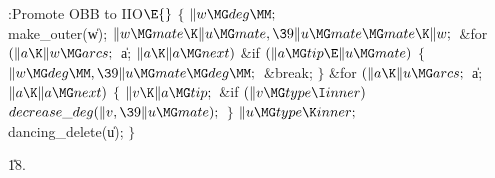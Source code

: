 \B{}:Promote OBB to IIO\X${}\E{}$\6
${}\{{}$\1\6
${}\|w\MG\\{deg}\MM;{}$\6
\\{make\_outer}(\|w);\6
${}\|w\MG\\{mate}\K\|u\MG\\{mate},\39\|u\MG\\{mate}\MG\\{mate}\K\|w;{}$\6
\&{for} ${}(\|a\K\|w\MG\\{arcs};{}$ \|a; ${}\|a\K\|a\MG\\{next}){}$\1\6
\&{if} ${}(\|a\MG\\{tip}\E\|u\MG\\{mate}){}$\5
${}\{{}$\1\6
${}\|w\MG\\{deg}\MM,\39\|u\MG\\{mate}\MG\\{deg}\MM;{}$\6
\&{break};\6
\4${}\}{}$\2\2\6
\&{for} ${}(\|a\K\|u\MG\\{arcs};{}$ \|a; ${}\|a\K\|a\MG\\{next}){}$\5
${}\{{}$\1\6
${}\|v\K\|a\MG\\{tip};{}$\6
\&{if} ${}(\|v\MG\\{type}\I\\{inner}){}$\1\5
${}\\{decrease\_deg}(\|v,\39\|u\MG\\{mate});{}$\2\6
\4${}\}{}$\2\6
${}\|u\MG\\{type}\K\\{inner};{}$\6
\\{dancing\_delete}(\|u);\6
\4${}\}{}$\2\par
\U18.\fi

